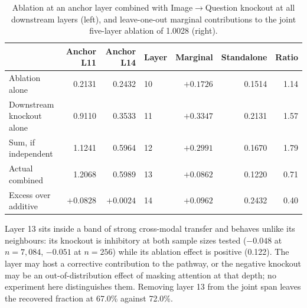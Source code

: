 \documentclass[11pt,a4paper]{article}
\begin{document}
\begin{table}[h]
  \centering
  \caption{Ablation at an anchor layer combined with Image$\rightarrow$Question
  knockout at all downstream layers (left), and leave-one-out marginal
  contributions to the joint five-layer ablation of 1.0028 (right).}
  \label{tab:downstream}
  \small
  \begin{tabular}{lrr@{\hskip 1.2em}lrrr}
    \toprule
    & Anchor L11 & Anchor L14 & Layer & Marginal & Standalone & Ratio \\
    \midrule
    Ablation alone            & 0.2131 & 0.2432 & 10 & $+0.1726$ & 0.1514 & 1.14 \\
    Downstream knockout alone & 0.9110 & 0.3533 & 11 & $+0.3347$ & 0.2131 & 1.57 \\
    Sum, if independent       & 1.1241 & 0.5964 & 12 & $+0.2991$ & 0.1670 & 1.79 \\
    Actual combined           & 1.2068 & 0.5989 & 13 & $+0.0862$ & 0.1220 & 0.71 \\
    Excess over additive      & $+0.0828$ & $+0.0024$ & 14 & $+0.0962$ & 0.2432 & 0.40 \\
    \bottomrule
  \end{tabular}
\end{table}

Layer 13 sits inside a band of strong cross-modal transfer and behaves unlike
its neighbours: its knockout is inhibitory at both sample sizes tested
($-0.048$ at $n = 7{,}084$, $-0.051$ at $n = 256$) while its ablation effect is
positive (0.122). The layer may host a corrective contribution to the pathway,
or the negative knockout may be an out-of-distribution effect of masking
attention at that depth; no experiment here distinguishes them. Removing layer
13 from the joint span leaves the recovered fraction at 67.0\% against 72.0\%.



\end{document}
